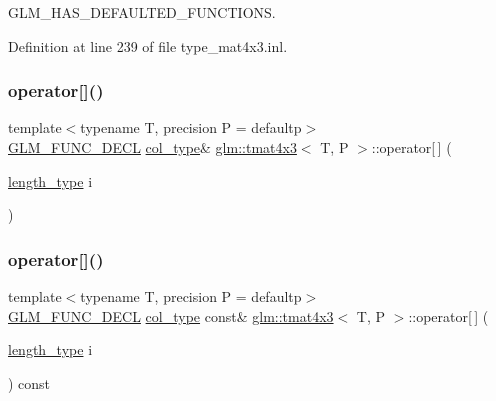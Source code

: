 G\+L\+M\+\_\+\+H\+A\+S\+\_\+\+D\+E\+F\+A\+U\+L\+T\+E\+D\+\_\+\+F\+U\+N\+C\+T\+I\+O\+NS. 



Definition at line 239 of file type\+\_\+mat4x3.\+inl.

\mbox{\label{structglm_1_1tmat4x3_a079c5c89aa4fb8235e738b1b4db13fc3}} 
\subsubsection{\texorpdfstring{operator[]()}{operator[]()}\hspace{0.1cm}{\footnotesize\ttfamily [1/2]}}
{\footnotesize\ttfamily template$<$typename T, precision P = defaultp$>$ \\
\mbox{\hyperlink{setup_8hpp_ab2d052de21a70539923e9bcbf6e83a51}{G\+L\+M\+\_\+\+F\+U\+N\+C\+\_\+\+D\+E\+CL}} \mbox{\hyperlink{structglm_1_1tmat4x3_ac64f78f27c32014f7d72233969526430}{col\+\_\+type}}\& \mbox{\hyperlink{structglm_1_1tmat4x3}{glm\+::tmat4x3}}$<$ T, P $>$\+::operator\mbox{[}$\,$\mbox{]} (\begin{DoxyParamCaption}\item[{\mbox{\hyperlink{structglm_1_1tmat4x3_a2f1ac502cc552a921a905e8a858fb1d7}{length\+\_\+type}}}]{i }\end{DoxyParamCaption})}

\mbox{\label{structglm_1_1tmat4x3_a7068a5dce773217a0bc7b44558790285}} 
\subsubsection{\texorpdfstring{operator[]()}{operator[]()}\hspace{0.1cm}{\footnotesize\ttfamily [2/2]}}
{\footnotesize\ttfamily template$<$typename T, precision P = defaultp$>$ \\
\mbox{\hyperlink{setup_8hpp_ab2d052de21a70539923e9bcbf6e83a51}{G\+L\+M\+\_\+\+F\+U\+N\+C\+\_\+\+D\+E\+CL}} \mbox{\hyperlink{structglm_1_1tmat4x3_ac64f78f27c32014f7d72233969526430}{col\+\_\+type}} const\& \mbox{\hyperlink{structglm_1_1tmat4x3}{glm\+::tmat4x3}}$<$ T, P $>$\+::operator\mbox{[}$\,$\mbox{]} (\begin{DoxyParamCaption}\item[{\mbox{\hyperlink{structglm_1_1tmat4x3_a2f1ac502cc552a921a905e8a858fb1d7}{length\+\_\+type}}}]{i }\end{DoxyParamCaption}) const}



